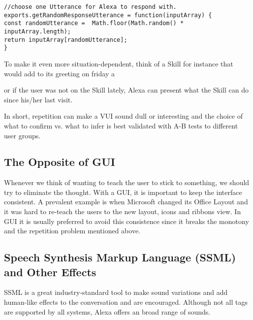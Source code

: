 \begin{verbatim}
//choose one Utterance for Alexa to respond with.
exports.getRandomResponseUtterance = function(inputArray) {
const randomUtterance =  Math.floor(Math.random() * inputArray.length);
return inputArray[randomUtterance];
}
\end{verbatim}

\noindent To make it even more situation-dependent, think of a Skill for instance that would add to its greeting on friday a 


\begin{flushright}
\end{flushright}


\noindent or if the user was not on the Skill lately, Alexa can present what the Skill can do since his/her last visit.



In short, repetition can make a VUI sound dull or interesting and the choice of what to confirm vs. what to infer is best validated with A-B tests to different user groups.




\subsection*{The Opposite of GUI}
Whenever we think of wanting to teach the user to stick to something, we should try to eliminate the thought. With a GUI, it is important to keep the interface consistent. A prevalent example is when Microsoft changed its Office Layout and it was hard to re-teach the users to the new layout, icons and ribbons view. In GUI it is usually preferred to avoid this consistence since it breaks the monotony and the repetition problem mentioned above.

\subsection*{Speech Synthesis Markup Language (SSML) and Other Effects}
SSML is a great industry-standard tool to make sound variations and add human-like effects to the conversation and are encouraged. Although not all tags are supported by all systems, Alexa offers an broad range of sounds.

